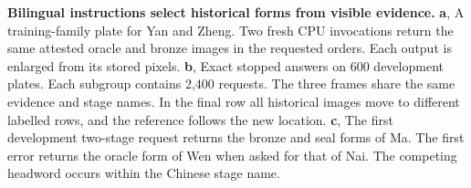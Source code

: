 \textbf{Bilingual instructions select historical forms from visible evidence.}
\textbf{a}, A training-family plate for Yan and Zheng. Two fresh CPU invocations return the same attested oracle and bronze images in the requested orders. Each output is enlarged from its stored pixels.
\textbf{b}, Exact stopped answers on 600 development plates. Each subgroup contains 2,400 requests. The three frames share the same evidence and stage names. In the final row all historical images move to different labelled rows, and the reference follows the new location.
\textbf{c}, The first development two-stage request returns the bronze and seal forms of Ma. The first error returns the oracle form of Wen when asked for that of Nai. The competing headword occurs within the Chinese stage name.
